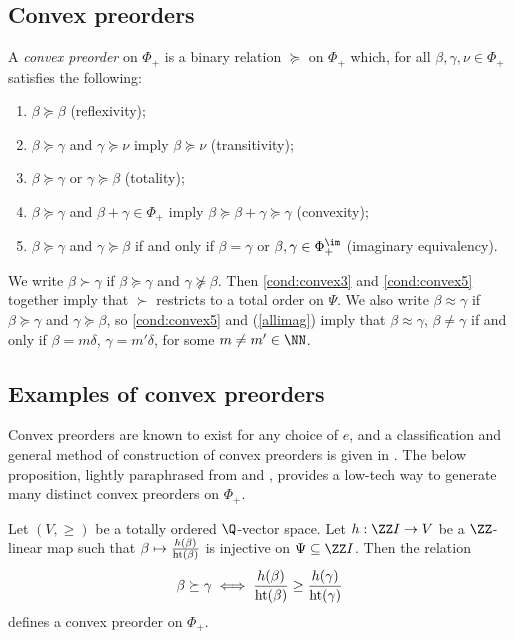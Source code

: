 \subsection{Convex preorders}
A {\em convex preorder} on \(\Phi_+\) is a binary relation \(\succeq\) on \(\Phi_+\) which, for all \(\beta, \gamma, \nu \in \Phi_+\) satisfies the following:
\begin{enumerate}
\item \(\beta \succeq \beta\) (reflexivity); \label{cond:convex1}
\item \(\beta \succeq \gamma\) and \(\gamma \succeq \nu\) imply \(\beta \succeq \nu\) (transitivity); \label{cond:convex2}
\item \(\beta \succeq \gamma\) or \(\gamma \succeq \beta\) (totality); \label{cond:convex3}
\item \(\beta \succeq \gamma\) and \(\beta + \gamma \in \Phi_+\) imply \(\beta \succeq \beta  + \gamma \succeq \gamma\) (convexity); \label{cond:convex4}
\item \(\beta \succeq \gamma\) and \(\gamma \succeq \beta\) if and only if \(\beta = \gamma\) or \(\beta, \gamma \in \Phi_+^\im\) (imaginary equivalency). \label{cond:convex5}
\end{enumerate}
We write \(\beta \succ \gamma\) if \(\beta \succeq \gamma\) and \(\gamma \not \succeq \beta\). Then \eqref{cond:convex3} and \eqref{cond:convex5} together imply that \(\succ\) restricts to a total order on \(\Psi\). We also write \(\beta \approx \gamma\) if \(\beta \succeq \gamma\) and \(\gamma \succeq \beta\), so \eqref{cond:convex5} and (\ref{allimag}) imply that \(\beta \approx \gamma\), \(\beta \neq \gamma\) if and only if \(\beta = m \delta\), \(\gamma = m'\delta\), for some \(m \neq m' \in \NN\). 

\subsection{Examples of convex preorders}
Convex preorders are known to exist for any choice of \(e\), and a classification and general method of construction of convex preorders is given in \cite{ItoClass}. The below proposition, lightly paraphrased from \cite[Example~2.14(ii)]{BaKaTiAffMir} and \cite[Example 3.5]{McNRepKLR3}, provides a low-tech way to generate many distinct convex preorders on \(\Phi_+\).

\begin{prop}\label{genconvex} 
Let \((V, \geq)\) be a totally ordered \(\Q\)-vector space. Let \(h:\ZZ I \to V\) be a \(\ZZ\)-linear map such that \(\beta \mapsto  \frac{h(\beta)}{\textup{ht}(\beta)} \) is injective on \(\Psi \subseteq \ZZ I\). Then the relation 
\begin{align*}
\beta \succeq \gamma \iff \frac{h(\beta)}{\textup{ht}(\beta)} \geq \frac{h(\gamma)}{\textup{ht}(\gamma)}
\end{align*}
defines a convex preorder on \(\Phi_+\).
\end{prop}

